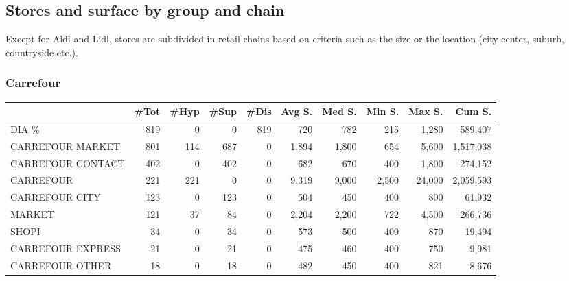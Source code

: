\documentclass[11pt]{article}
\begin{document}
\begin{table}[H]
\end{table}

\subsection{Stores and surface by group and chain}

Except for Aldi and Lidl, stores are subdivided in retail chains based on criteria such as the size or the location (city center, suburb, countryside etc.).

\subsubsection{Carrefour}

\begin{table}[H]
\footnotesize
\setlength{\tabcolsep}{2pt}

\begin{tabular}{lrrrrrrrrr}
\toprule
{} &       \#Tot &       \#Hyp &       \#Sup &       \#Dis &     Avg S. &     Med S. &     Min S. &     Max S. &     Cum S. \\
\midrule
DIA \%             &        819 &          0 &          0 &        819 &        720 &        782 &        215 &      1,280 &    589,407 \\
CARREFOUR MARKET  &        801 &        114 &        687 &          0 &      1,894 &      1,800 &        654 &      5,600 &  1,517,038 \\
CARREFOUR CONTACT &        402 &          0 &        402 &          0 &        682 &        670 &        400 &      1,800 &    274,152 \\
CARREFOUR         &        221 &        221 &          0 &          0 &      9,319 &      9,000 &      2,500 &     24,000 &  2,059,593 \\
CARREFOUR CITY    &        123 &          0 &        123 &          0 &        504 &        450 &        400 &        800 &     61,932 \\
MARKET            &        121 &         37 &         84 &          0 &      2,204 &      2,200 &        722 &      4,500 &    266,736 \\
SHOPI             &         34 &          0 &         34 &          0 &        573 &        500 &        400 &        870 &     19,494 \\
CARREFOUR EXPRESS &         21 &          0 &         21 &          0 &        475 &        460 &        400 &        750 &      9,981 \\
CARREFOUR OTHER   &         18 &          0 &         18 &          0 &        482 &        450 &        400 &        821 &      8,676 \\
\bottomrule
\end{tabular}

\end{table}
\end{document}
